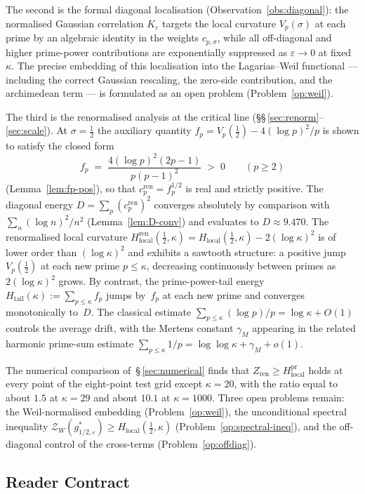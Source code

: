 \documentclass[11pt]{article}
\newcommand{\Hlocal}{H_{\mathrm{local}}}
\newcommand{\Hren}{H_{\mathrm{local}}^{\mathrm{ren}}}
\newcommand{\cren}{c_p^{\mathrm{ren}}}
\newcommand{\Zren}{Z_{\mathrm{ren}}}
\begin{document}
The second is the formal diagonal localisation
(Observation~\ref{obs:diagonal}): the normalised Gaussian
correlation $K_\varepsilon$ targets the local curvature
$V_p(\sigma)$ at each prime by an algebraic identity in the
weights $c_{p,\sigma}$, while all off-diagonal and higher
prime-power contributions are exponentially suppressed as
$\varepsilon\to 0$ at fixed $\kappa$.
The precise embedding of this localisation into the
Lagarias--Weil functional --- including the correct Gaussian
rescaling, the zero-side contribution, and the archimedean
term --- is formulated as an open problem
(Problem~\ref{op:weil}).

The third is the renormalised analysis at the critical line
(\S\S\,\ref{sec:renorm}--\ref{sec:scale}).
At $\sigma=\tfrac12$ the auxiliary quantity
$f_p=V_p(\tfrac12)-4(\log p)^2/p$ is shown to satisfy the
closed form
\[
f_p \;=\; \frac{4(\log p)^2(2p-1)}{p(p-1)^2} \;>\; 0
\qquad (p\ge 2)
\]
(Lemma~\ref{lem:fp-pos}), so that $\cren=f_p^{1/2}$ is real
and strictly positive.
The diagonal energy $D=\sum_p(\cren)^2$ converges absolutely by
comparison with $\sum_n (\log n)^2/n^2$ (Lemma~\ref{lem:D-conv})
and evaluates to $D\approx 9.470$.
The renormalised local curvature
$\Hren(\tfrac12,\kappa)=\Hlocal(\tfrac12,\kappa)-2(\log\kappa)^2$
is of lower order than $(\log\kappa)^2$ and exhibits a sawtooth
structure: a positive jump $V_p(\tfrac12)$ at each new prime
$p\le\kappa$, decreasing continuously between primes as
$2(\log\kappa)^2$ grows.
By contrast, the prime-power-tail energy
$H_{\mathrm{tail}}(\kappa):=\sum_{p\le\kappa}f_p$ jumps
by~$f_p$ at each new prime and converges monotonically to~$D$.
The classical estimate
$\sum_{p\le\kappa}(\log p)/p=\log\kappa+O(1)$ controls
the average drift, with the Mertens constant $\gamma_M$
appearing in the related harmonic prime-sum estimate
$\sum_{p\le\kappa}1/p = \log\log\kappa + \gamma_M + o(1)$.

The numerical comparison of~\S\,\ref{sec:numerical} finds
that $\Zren\ge\Hlocal^{\mathrm{pr}}$ holds at every point of the eight-point
test grid except $\kappa=20$, with the ratio equal to about $1.5$
at $\kappa=29$ and about $10.1$ at $\kappa=1000$.
Three open problems remain:
the Weil-normalised embedding (Problem~\ref{op:weil}),
the unconditional spectral inequality
$\mathcal{Z}_W(g^*_{1/2,\varepsilon})\ge\Hlocal(\tfrac12,\kappa)$
(Problem~\ref{op:spectral-ineq}), and
the off-diagonal control of the cross-terms
(Problem~\ref{op:offdiag}).

\subsection{Reader Contract}
\end{document}
